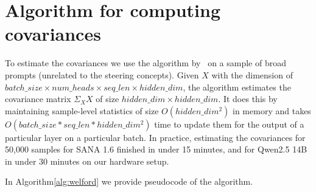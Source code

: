
\section{Algorithm for computing covariances}

\label{sec:welford_algorithm}

To estimate the covariances we use the algorithm by~\cite{Welford01081962} on a sample of broad prompts (unrelated to the steering concepts). Given $X$ with the dimension of $batch\_size \times num\_heads \times seq\_len \times hidden\_dim$, the algorithm estimates the covariance matrix $\Sigma_XX$ of size $hidden\_dim \times hidden\_dim$. It does this by maintaining sample-level statistics of size $O(hidden\_dim^2)$ in memory and takes $O(batch\_size * seq\_len * hidden\_dim^2)$ time to update them for the output of a particular layer on a particular batch. In practice, estimating the covariances for 50,000 samples for SANA 1.6 finished in under 15 minutes, and for Qwen2.5 14B in under 30 minutes on our hardware setup. 

In Algorithm\ref{alg:welford} we provide pseudocode of the algorithm.

